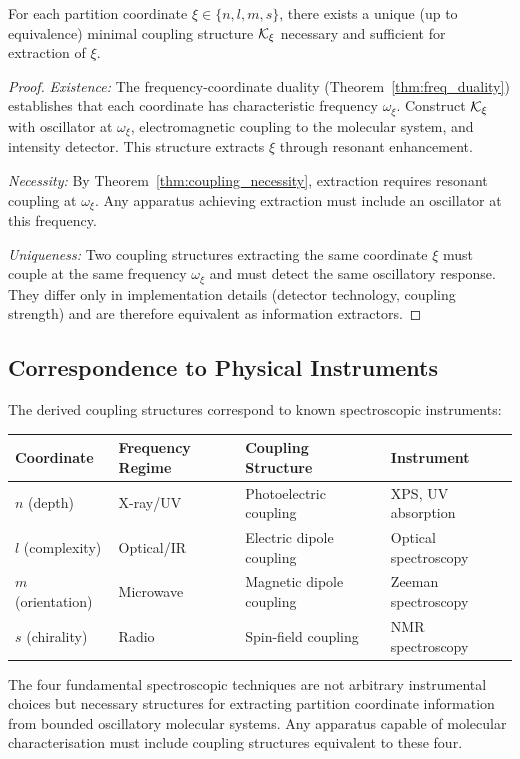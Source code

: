 \begin{theorem}
\label{thm:instrument_necessity}
For each partition coordinate $\xi \in \{n, l, m, s\}$, there exists a unique (up to equivalence) minimal coupling structure $\mathcal{K}_\xi$ necessary and sufficient for extraction of $\xi$.
\end{theorem}

\begin{proof}
\textit{Existence:} The frequency-coordinate duality (Theorem~\ref{thm:freq_duality}) establishes that each coordinate has characteristic frequency $\omega_\xi$. Construct $\mathcal{K}_\xi$ with oscillator at $\omega_\xi$, electromagnetic coupling to the molecular system, and intensity detector. This structure extracts $\xi$ through resonant enhancement.

\textit{Necessity:} By Theorem~\ref{thm:coupling_necessity}, extraction requires resonant coupling at $\omega_\xi$. Any apparatus achieving extraction must include an oscillator at this frequency.

\textit{Uniqueness:} Two coupling structures extracting the same coordinate $\xi$ must couple at the same frequency $\omega_\xi$ and must detect the same oscillatory response. They differ only in implementation details (detector technology, coupling strength) and are therefore equivalent as information extractors.
\end{proof}

\subsection{Correspondence to Physical Instruments}

The derived coupling structures correspond to known spectroscopic instruments:

\begin{center}
\begin{tabular}{llll}
\toprule
\textbf{Coordinate} & \textbf{Frequency Regime} & \textbf{Coupling Structure} & \textbf{Instrument} \\
\midrule
$n$ (depth) & X-ray/UV & Photoelectric coupling & XPS, UV absorption \\
$l$ (complexity) & Optical/IR & Electric dipole coupling & Optical spectroscopy \\
$m$ (orientation) & Microwave & Magnetic dipole coupling & Zeeman spectroscopy \\
$s$ (chirality) & Radio & Spin-field coupling & NMR spectroscopy \\
\bottomrule
\end{tabular}
\end{center}

The four fundamental spectroscopic techniques are not arbitrary instrumental choices but necessary structures for extracting partition coordinate information from bounded oscillatory molecular systems. Any apparatus capable of molecular characterisation must include coupling structures equivalent to these four.
